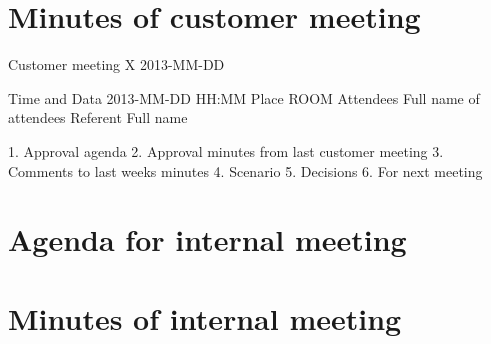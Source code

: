 \section{Minutes of customer meeting}

Customer meeting X 
2013-MM-DD

Time and Data 	2013-MM-DD HH:MM
Place			ROOM
Attendees  		Full name of attendees
Referent  		Full name

1. Approval agenda
2. Approval minutes from last customer meeting
3. Comments to last weeks minutes
4. Scenario
5. Decisions
6. For next meeting

\section{Agenda for internal meeting}

\section{Minutes of internal meeting}